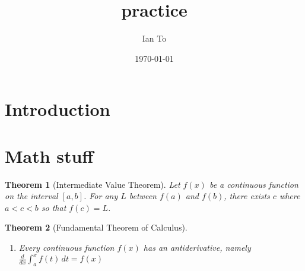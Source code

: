 \documentclass[12pt]{article}
\title{practice}
\author{Ian To}
\date{\today}
\newtheorem{theorem}{Theorem}
\begin{document}
\maketitle

\section{Introduction}

\section{Math stuff}
\begin{theorem}[Intermediate Value Theorem]
Let $f(x)$ be a continuous function on the interval $[a,b]$.
For any $L$ between $f(a)$ and $f(b)$, there exists $c$ where $a<c<b$ so that $f(c)=L$.
\end{theorem}
\begin{theorem}[Fundamental Theorem of Calculus]\mbox{}

	\begin{enumerate}
		\item Every continuous function $f(x)$ has an antiderivative, namely $\frac{d}{dx}\int_{a}^{x}f(t)\, dt = f(x)$
		
	\end{enumerate}

\end{theorem}
\end{document}
